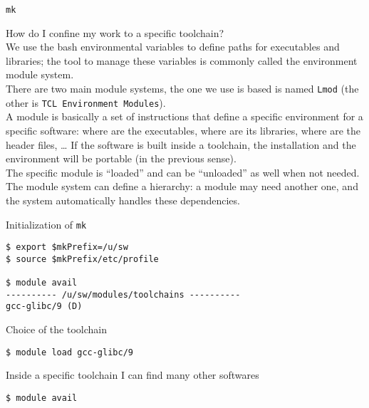 \documentclass[10pt]{beamer}
\begin{document}
\begin{frame}{\texttt{mk}}

How do I confine my work to a specific toolchain?\\[3mm]

We use the bash environmental variables to define paths for executables and libraries; the tool to manage these variables is commonly called 
the environment module system.\\[3mm]

There are two main module systems, the one we use is based is named \texttt{Lmod} (the other is \texttt{TCL Environment Modules}).\\[3mm]

A module is basically a set of instructions that define a specific environment for a specific software: where are the executables, where are its libraries, where are the header files, … 
If the software is built inside a toolchain, the installation and the environment  will be portable (in the previous sense).\\[3mm]

The specific module is “loaded” and can be “unloaded” as well when not needed.\\[3mm]

The module system can define a hierarchy: a module may need another one, and the system automatically handles these dependencies.

\end{frame}

\begin{frame}[fragile]

Initialization of \texttt{mk}

\begin{verbatim}
$ export $mkPrefix=/u/sw
$ source $mkPrefix/etc/profile

$ module avail
---------- /u/sw/modules/toolchains ----------
gcc-glibc/9 (D)
\end{verbatim}

Choice of the toolchain
\begin{verbatim}
$ module load gcc-glibc/9
\end{verbatim}

Inside a specific toolchain I can find many other softwares
\begin{verbatim}
$ module avail
\end{verbatim}
\end{frame}
\end{document}
